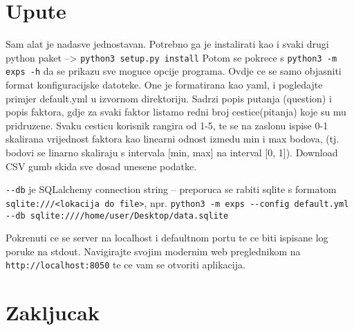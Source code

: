 \documentclass[times, utf8, seminar]{fer}
\begin{document}
\chapter{Upute}

Sam alat je nadasve jednostavan. Potrebno ga je instalirati kao i svaki drugi python paket --> \verb|python3 setup.py install|  Potom se pokrece s \verb|python3 -m exps -h| da se prikazu sve moguce opcije programa. Ovdje ce se samo objasniti format konfiguracijske datoteke. One je formatirana kao yaml, i pogledajte primjer default.yml u izvornom direktoriju. Sadrzi popis putanja (question) i popis faktora, gdje za svaki faktor listamo redni broj cestice(pitanja) koje su mu pridruzene. Svaku cesticu korisnik rangira od 1-5, te se na zaslonu ispise 0-1 skalirana vrijednost faktora kao linearni odnost izmedu min i max bodova, (tj. bodovi se linarno skaliraju s intervala [min, max] na interval [0, 1]). Download CSV gumb skida sve dosad unesene podatke.

\verb|--db| je SQLalchemy connection string -- preporuca se rabiti sqlite s formatom \verb|sqlite:///<lokacija do file>|, npr. \verb|python3 -m exps --config default.yml --db sqlite:////home/user/Desktop/data.sqlite|

Pokrenuti ce se server na localhost i defaultnom portu te ce biti ispisane log poruke na stdout. Navigirajte svojim modernim web preglednikom na \verb|http://localhost:8050| te ce vam se otvoriti aplikacija.

\chapter{Zakljucak}



\end{document}
